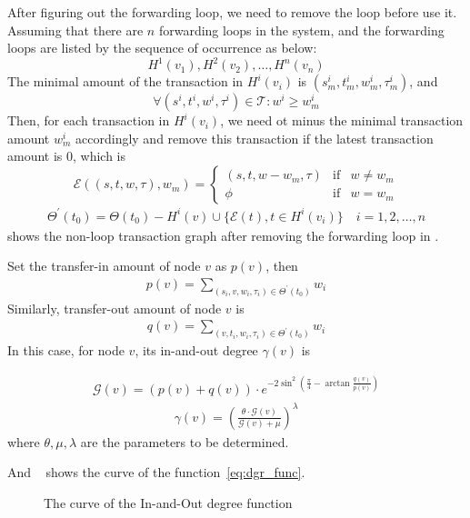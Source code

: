 After figuring out the forwarding loop, we need to remove the loop before use it. Assuming that there are $n$ forwarding loops in the system, and the forwarding loops are listed by the sequence of occurrence as below:
\[
H^1(v_1), H^2(v_2), \dots, H^n(v_n)\]
\noindent The minimal amount of the transaction in $H^i(v_i)$ is $(s^i_m, t^i_m, w^i_m, \tau^i_m)$, and
\[
\forall (s^i, t^i, w^i, \tau^i) \in \mathcal{T} : w^i \ge w^i_m
\]
\noindent Then, for each transaction in $H^i(v_i)$, we need ot minus the minimal transaction amount $w^i_m$ accordingly and remove this transaction if the latest transaction amount is 0, which is
\[
\mathcal{E}((s, t, w, \tau), w_m) = \left\{ \begin{array}{rcl}
(s, t, w-w_m, \tau) & \mbox{if} & w \ne w_m \\
\phi & \mbox{if} & w = w_m
\end{array}\right.
\]
\begin{align}
\Theta^{\prime}(t_0)=\Theta(t_0)-H^i(v) \cup \{\mathcal{E}(t), t\in H^i(v_i)\} \quad i = 1, 2,\dots, n
\end{align}
\noindent {} shows the non-loop transaction graph after removing the forwarding loop in .


Set the transfer-in amount of node $v$ as $p(v)$, then
\begin{align}
\label{eq:dgr_func}
p(v) = \sum_{(s_i, v, w_i, \tau_i) \in \Theta^{\prime}(t_0)}{w_i}
\end{align}
\noindent Similarly, transfer-out amount of node $v$ is
\begin{align}
q(v) = \sum_{(v, t_i, w_i, \tau_i) \in \Theta^{\prime}(t_0)}{w_i}
\end{align}
\noindent In this case,
for node $v$, its in-and-out degree $\gamma(v)$ is

\begin{align}
\mathcal{G}(v) = (p(v) + q(v)) \cdot e^{-2\sin^2{(\frac{\pi}{4} - \arctan\frac{q(v)}{p(v)})}}
\end{align}
\begin{align}
\gamma(v) = (\frac{\theta\cdot \mathcal{G}(v)}{\mathcal{G}(v) + \mu})^{\lambda}
\end{align}
\noindent where $\theta, \mu, \lambda$ are the parameters to be determined.


And ~ shows the curve of the function~\ref{eq:dgr_func}.
\begin{figure}
  \centering
  
\caption{The curve of the In-and-Out degree function \label{fig-surf}}
\end{figure}

